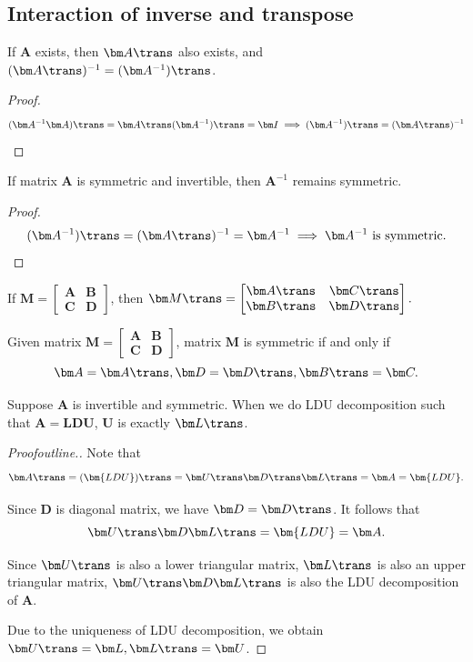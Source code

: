 \subsection{Interaction of inverse and transpose}
\begin{proposition}
If $\bm A$ exists, then $\bm A\trans$ also exists, and $(\bm A\trans)^{-1} = (\bm A^{-1})\trans$.
\end{proposition}
\begin{proof}
\[(\bm A^{-1}\bm A)\trans = \bm A\trans(\bm A^{-1})\trans = \bm I \implies (\bm A^{-1})\trans = (\bm A\trans)^{-1}\]
\end{proof}
\begin{corollary}
If matrix $\bm A$ is symmetric and invertible, then $\bm A^{-1}$ remains symmetric.
\end{corollary}
\begin{proof}
\[
(\bm A^{-1})\trans = (\bm A\trans)^{-1} = \bm A^{-1}
\implies \text{$\bm A^{-1}$ is symmetric.}
\]
\end{proof}
\begin{proposition}
If $\bm M = \begin{bmatrix}
\bm A&\bm B\\\bm C&\bm D
\end{bmatrix}$, then $\bm M\trans = \begin{bmatrix}
\bm A\trans&\bm C\trans\\\bm B\trans&\bm D\trans
\end{bmatrix}.$
\end{proposition}
\begin{corollary}
Given matrix $\bm M = \begin{bmatrix}
\bm A&\bm B\\\bm C&\bm D
\end{bmatrix}$, matrix $\bm M$ is symmetric if and only if \[
\bm A=\bm A\trans,\bm D =\bm D\trans,\bm B\trans = \bm C.
\]
\end{corollary}
\begin{proposition}
Suppose $\bm A$ is invertible and symmetric. When we do LDU decomposition such that $\bm A = \bm L\bm D\bm U$, $\bm U$ is exactly $\bm L\trans$.
\end{proposition}
\begin{proof}[Proofoutline.]
Note that
\[
\bm A\trans = (\bm{LDU})\trans = \bm U\trans\bm D\trans\bm L\trans=\bm A = \bm{LDU}.
\]

Since $\bm D$ is diagonal matrix, we have $\bm D = \bm D\trans$. It follows that
\[
\bm U\trans\bm D\bm L\trans= \bm{LDU}=\bm A.
\]

Since $\bm U\trans$ is also a lower triangular matrix, $\bm L\trans$ is also an upper triangular matrix, $\bm U\trans\bm D\bm L\trans$ is also the LDU decomposition of $\bm A$.

Due to the uniqueness of LDU decomposition, we obtain $\bm U\trans = \bm L,\bm L\trans = \bm U$.
\end{proof}
